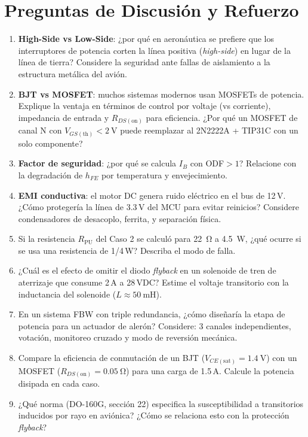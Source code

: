 \documentclass[11pt]{article}
\begin{document}
\section{Preguntas de Discusión y Refuerzo}
\begin{enumerate}
  \item \textbf{High-Side vs Low-Side}: ¿por qué en aeronáutica se prefiere que los
        interruptores de potencia corten la línea positiva (\emph{high-side}) en lugar
        de la línea de tierra? Considere la seguridad ante fallas de aislamiento a la
        estructura metálica del avión.
  \item \textbf{BJT vs MOSFET}: muchos sistemas modernos usan MOSFETs de potencia.
        Explique la ventaja en términos de control por voltaje (vs corriente),
        impedancia de entrada y $R_{DS(\text{on})}$ para eficiencia. ¿Por qué un MOSFET
        de canal N con $V_{GS(\text{th})}<\SI{2}{\volt}$ puede reemplazar al 2N2222A +
        TIP31C con un solo componente?
  \item \textbf{Factor de seguridad}: ¿por qué se calcula $I_B$ con ODF$>1$? Relacione
        con la degradación de $h_{FE}$ por temperatura y envejecimiento.
  \item \textbf{EMI conductiva}: el motor DC genera ruido eléctrico en el bus de 12\,V.
        ¿Cómo protegería la línea de 3.3\,V del MCU para evitar reinicios? Considere
        condensadores de desacoplo, ferrita, y separación física.
  \item Si la resistencia $R_\text{PU}$ del Caso 2 se calculó para \SI{22}{\ohm} a
        \SI{4.5}{\watt}, ¿qué ocurre si se usa una resistencia de 1/4\,W? Describa el
        modo de falla.
  \item ¿Cuál es el efecto de omitir el diodo \emph{flyback} en un solenoide de tren de
        aterrizaje que consume 2\,A a 28\,VDC? Estime el voltaje transitorio con la
        inductancia del solenoide ($L\approx\SI{50}{\milli\henry}$).
  \item En un sistema FBW con triple redundancia, ¿cómo diseñaría la etapa de potencia
        para un actuador de alerón? Considere: 3 canales independientes, votación,
        monitoreo cruzado y modo de reversión mecánica.
  \item Compare la eficiencia de conmutación de un BJT ($V_{CE(\text{sat})}=\SI{1.4}{\volt}$)
        con un MOSFET ($R_{DS(\text{on})}=\SI{0.05}{\ohm}$) para una carga de 1.5\,A.
        Calcule la potencia disipada en cada caso.
  \item ¿Qué norma (DO-160G, sección 22) especifica la susceptibilidad a transitorios
        inducidos por rayo en aviónica? ¿Cómo se relaciona esto con la protección
        \emph{flyback}?
\end{enumerate}
\end{document}
